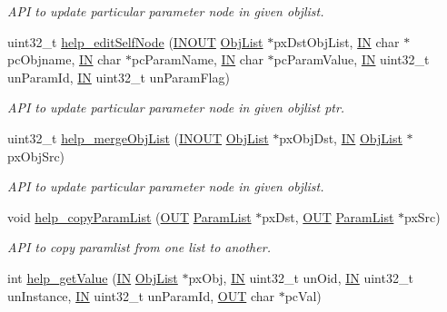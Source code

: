 \begin{DoxyCompactItemize}
\begin{DoxyCompactList}\small\item\em A\-P\-I to update particular parameter node in given objlist. \end{DoxyCompactList}\item 
uint32\-\_\-t \hyperlink{group__LIBHELP_ga134e2111b03b78aada0209065e953475}{help\-\_\-edit\-Self\-Node} (\hyperlink{group__LIBHELP_ga62766f3ea8784d1db62df989f8f33d2d}{I\-N\-O\-U\-T} \hyperlink{structObjList}{Obj\-List} $\ast$px\-Dst\-Obj\-List, \hyperlink{group__LIBHELP_gac2bbd6d630a06a980d9a92ddb9a49928}{I\-N} char $\ast$pc\-Objname, \hyperlink{group__LIBHELP_gac2bbd6d630a06a980d9a92ddb9a49928}{I\-N} char $\ast$pc\-Param\-Name, \hyperlink{group__LIBHELP_gac2bbd6d630a06a980d9a92ddb9a49928}{I\-N} char $\ast$pc\-Param\-Value, \hyperlink{group__LIBHELP_gac2bbd6d630a06a980d9a92ddb9a49928}{I\-N} uint32\-\_\-t un\-Param\-Id, \hyperlink{group__LIBHELP_gac2bbd6d630a06a980d9a92ddb9a49928}{I\-N} uint32\-\_\-t un\-Param\-Flag)
\begin{DoxyCompactList}\small\item\em A\-P\-I to update particular parameter node in given objlist ptr. \end{DoxyCompactList}\item 
uint32\-\_\-t \hyperlink{group__LIBHELP_ga247c33f35cdf5ddd5cdd3a24311faa55}{help\-\_\-merge\-Obj\-List} (\hyperlink{group__LIBHELP_ga62766f3ea8784d1db62df989f8f33d2d}{I\-N\-O\-U\-T} \hyperlink{structObjList}{Obj\-List} $\ast$px\-Obj\-Dst, \hyperlink{group__LIBHELP_gac2bbd6d630a06a980d9a92ddb9a49928}{I\-N} \hyperlink{structObjList}{Obj\-List} $\ast$px\-Obj\-Src)
\begin{DoxyCompactList}\small\item\em A\-P\-I to update particular parameter node in given objlist. \end{DoxyCompactList}\item 
void \hyperlink{group__LIBHELP_gafa30a46dc07c618ae6c00e9f0322e89c}{help\-\_\-copy\-Param\-List} (\hyperlink{group__LIBHELP_gaec78e7a9e90a406a56f859ee456e8eae}{O\-U\-T} \hyperlink{structParamList}{Param\-List} $\ast$px\-Dst, \hyperlink{group__LIBHELP_gaec78e7a9e90a406a56f859ee456e8eae}{O\-U\-T} \hyperlink{structParamList}{Param\-List} $\ast$px\-Src)
\begin{DoxyCompactList}\small\item\em A\-P\-I to copy paramlist from one list to another. \end{DoxyCompactList}\item 
int \hyperlink{group__LIBHELP_gabf01f33632a265d5bb43ca9b31a87a2e}{help\-\_\-get\-Value} (\hyperlink{group__LIBHELP_gac2bbd6d630a06a980d9a92ddb9a49928}{I\-N} \hyperlink{structObjList}{Obj\-List} $\ast$px\-Obj, \hyperlink{group__LIBHELP_gac2bbd6d630a06a980d9a92ddb9a49928}{I\-N} uint32\-\_\-t un\-Oid, \hyperlink{group__LIBHELP_gac2bbd6d630a06a980d9a92ddb9a49928}{I\-N} uint32\-\_\-t un\-Instance, \hyperlink{group__LIBHELP_gac2bbd6d630a06a980d9a92ddb9a49928}{I\-N} uint32\-\_\-t un\-Param\-Id, \hyperlink{group__LIBHELP_gaec78e7a9e90a406a56f859ee456e8eae}{O\-U\-T} char $\ast$pc\-Val)

\end{DoxyCompactItemize}
